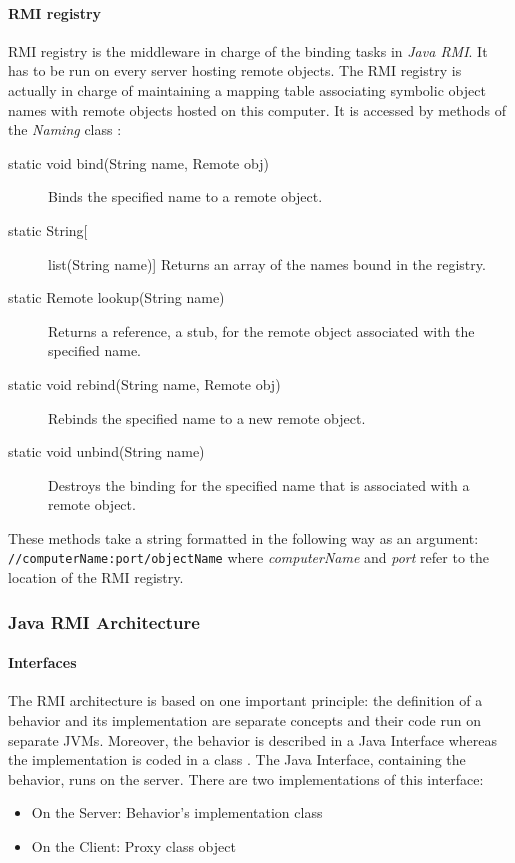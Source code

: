 \paragraph{RMI registry}
RMI registry is the middleware in charge of the binding tasks in \textit{Java RMI}. It has to be run on every server hosting remote objects. The RMI registry is actually in charge of maintaining a mapping table associating symbolic object names with remote objects hosted on this computer. It is accessed by methods of the \textit{Naming} class :
\begin{description}
\item[static void 	bind(String name, Remote obj)]
    Binds the specified name to a remote object.
\item[static String[] 	list(String name)]
    Returns an array of the names bound in the registry.
\item[static Remote 	lookup(String name)]
    Returns a reference, a stub, for the remote object associated with the specified name.
\item[static void 	rebind(String name, Remote obj)]
    Rebinds the specified name to a new remote object.
\item[static void 	unbind(String name)]
    Destroys the binding for the specified name that is associated with a remote object.
\end{description}
These methods take a string formatted in the following way as an argument:\\
\verb|//computerName:port/objectName|
where \textit{computerName} and \textit{port} refer to the location of the RMI registry.
\cite{DS-book}

\subsubsection{Java RMI Architecture} 
\label{JavaRMIArchitecture}

\paragraph{Interfaces}
\label{JavaRMIinterfaces}
The RMI architecture is based on one important principle: the definition of a behavior and its implementation are separate concepts and their code run on separate JVMs. Moreover, the behavior is described in a Java Interface whereas the implementation is coded in a class \cite{RMI-art5}.
The Java Interface, containing the behavior, runs on the server. There are two implementations of this interface:
\begin{itemize}
	\item On the Server: Behavior's implementation class
	\item On the Client: Proxy class object
\end{itemize}

